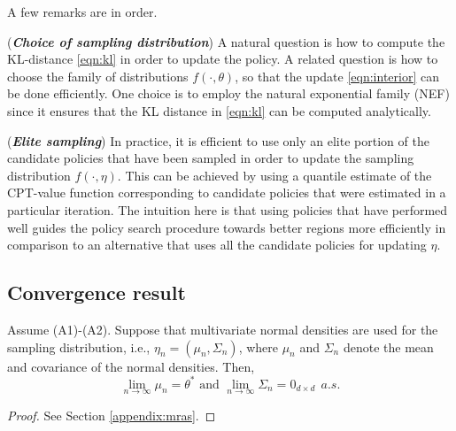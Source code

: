 \documentclass[11pt,letterpaper,english]{article}
\begin{document}
                    
A few remarks are in order.
\begin{remark}(\textbf{\textit{Choice of sampling distribution}})
A natural question is how to compute the KL-distance \eqref{eqn:kl} in order to update the policy. A related question is how to choose the family of distributions $f(\cdot,\theta)$, so that the update \eqref{eqn:interior} can be done efficiently. One choice is to employ the natural exponential family (NEF) since it ensures that the KL distance in \eqref{eqn:kl} can be computed analytically. %
\end{remark}

\begin{remark}(\textbf{\textit{Elite sampling}})
In practice, it is efficient to use only an elite portion of the candidate policies that have been sampled in order to update the sampling distribution $f(\cdot,\eta)$. This can be achieved by using a quantile estimate of the CPT-value function corresponding to candidate policies that were estimated in a particular iteration. The intuition here is that using policies that have performed well guides the policy search procedure towards better regions more efficiently in comparison to an alternative that uses all the candidate policies for updating $\eta$.
\end{remark}

\subsection{Convergence result}
\begin{theorem}\label{thm:mras}
Assume (A1)-(A2). Suppose that multivariate normal densities are used for the sampling distribution, i.e., $\eta_n = (\mu_n, \Sigma_n)$, where $\mu_n$ and $\Sigma_n$ denote the mean and covariance of the normal densities.
Then, 
\begin{equation}\label{eqn:smain}
\lim_{n\rightarrow \infty}\mu_n=\theta^* \text{ and } \lim_{n\rightarrow \infty}\Sigma_n=0_{d\times d}~~a.s.
\end{equation}
\end{theorem}
\begin{proof}
 See Section \ref{appendix:mras}.
\end{proof}
\end{document}
